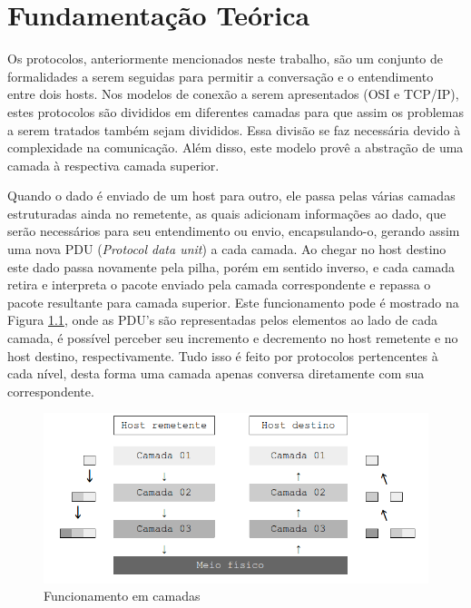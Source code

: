 
\chapter{Fundamentação Teórica}
\label{chap:fundamentacaoTeorica}

Os protocolos, anteriormente mencionados neste trabalho, são um conjunto de formalidades a serem seguidas para permitir a conversação e o entendimento entre dois hosts. Nos modelos de conexão a serem apresentados (OSI e TCP/IP), estes protocolos são divididos em diferentes camadas para que assim os problemas a serem tratados também sejam divididos. Essa divisão se faz necessária devido à complexidade na comunicação. Além disso, este modelo provê a abstração de uma camada à respectiva camada superior.

Quando o dado é enviado de um host para outro, ele passa pelas várias camadas estruturadas ainda no remetente, as quais adicionam informações ao dado, que serão necessários para seu entendimento ou envio, encapsulando-o, gerando assim uma nova PDU (\textit{Protocol data unit}) a cada camada. Ao chegar no host destino este dado passa novamente pela pilha, porém em sentido inverso, e cada camada retira e interpreta o pacote enviado pela camada correspondente e repassa o pacote resultante para camada superior. Este funcionamento pode é mostrado na Figura \ref{fig:camadas}, onde as PDU's são representadas pelos elementos ao lado de cada camada, é possível perceber seu incremento e decremento no host remetente e no host destino, respectivamente. Tudo isso é feito por protocolos pertencentes à cada nível, desta forma uma camada apenas conversa diretamente com sua correspondente.

\begin{figure}[H]
	\centering
    \includegraphics[width=\textwidth]{04-figuras/camadas.png}
    \caption{Funcionamento em camadas}
    \label{fig:camadas}
\end{figure}  	 
	 
